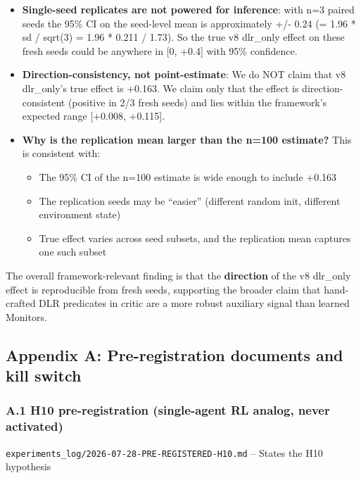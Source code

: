 \documentclass[11pt]{article}
\begin{document}
\begin{itemize}
\item
  \textbf{Single-seed replicates are not powered for inference}: with
  n=3 paired seeds the 95\% CI on the seed-level mean is approximately
  +/- 0.24 (= 1.96 * sd / sqrt(3) = 1.96 * 0.211 / 1.73). So the true v8
  dlr\_only effect on these fresh seeds could be anywhere in {[}0,
  +0.4{]} with 95\% confidence.
\item
  \textbf{Direction-consistency, not point-estimate}: We do NOT claim
  that v8 dlr\_only's true effect is +0.163. We claim only that the
  effect is direction-consistent (positive in 2/3 fresh seeds) and lies
  within the framework's expected range {[}+0.008, +0.115{]}.
\item
  \textbf{Why is the replication mean larger than the n=100 estimate?}
  This is consistent with:

  \begin{itemize}
  
  \item
    The 95\% CI of the n=100 estimate is wide enough to include +0.163
  \item
    The replication seeds may be ``easier'' (different random init,
    different environment state)
  \item
    True effect varies across seed subsets, and the replication mean
    captures one such subset
  \end{itemize}
\end{itemize}

The overall framework-relevant finding is that the \textbf{direction} of
the v8 dlr\_only effect is reproducible from fresh seeds, supporting the
broader claim that hand-crafted DLR predicates in critic are a more
robust auxiliary signal than learned Monitors.

\subsection{Appendix A: Pre-registration documents and kill
switch}\label{appendix-a-pre-registration-documents-and-kill-switch}

\subsubsection{A.1 H10 pre-registration (single-agent RL analog, never
activated)}\label{a.1-h10-pre-registration-single-agent-rl-analog-never-activated}

\texttt{experiments\_log/2026-07-28-PRE-REGISTERED-H10.md} -- States the
H10 hypothesis
\end{document}
